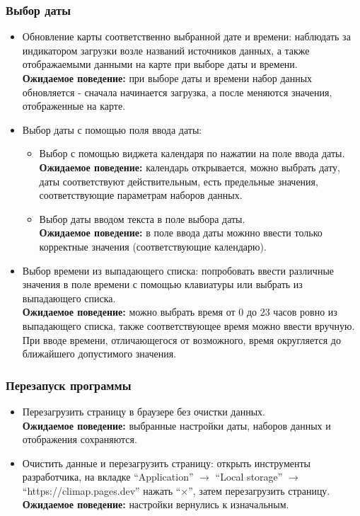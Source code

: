 \documentclass[a4paper, 12pt]{article}
\begin{document}
	\subsubsection{Выбор даты}
	\begin{itemize}
		\item Обновление карты соответственно выбранной дате и времени: наблюдать за индикатором загрузки возле названий
			источников данных, а также отображаемыми данными на карте при выборе даты и времени. \\ \textbf{Ожидаемое
			поведение:} при выборе даты и времени набор данных обновляется - сначала начинается загрузка, а после меняются
			значения, отображенные на карте.

		\item Выбор даты с помощью поля ввода даты:
			\begin{itemize}
				\item Выбор с помощью виджета календаря по нажатии на поле ввода даты. \\ \textbf{Ожидаемое поведение:} календарь
					открывается, можно выбрать дату, даты соответствуют действительным, есть предельные значения, соответствующие параметрам
					наборов данных.

				\item Выбор даты вводом текста в поле выбора даты. \\ \textbf{Ожидаемое поведение:} в поле ввода даты можнно ввести
					только корректные значения (соответствующие календарю).
			\end{itemize}

		\item Выбор времени из выпадающего списка: попробовать ввести различные значения в поле времени с помощью клавиатуры
			или выбрать из выпадающего списка. \\ \textbf{Ожидаемое поведение:} можно выбрать время от 0 до 23 часов ровно из
			выпадающего списка, также соответствующее время можно ввести вручную. При вводе времени, отличающегося от возможного,
			время округляется до ближайшего допустимого значения.
	\end{itemize}

	\subsubsection{Перезапуск программы}\label{subsubsection:6:1:4}
	\begin{itemize}
		\item Перезагрузить страницу в браузере без очистки данных. \\ \textbf{Ожидаемое поведение:} выбранные настройки даты,
			наборов данных и отображения сохраняются.

		\item Очистить данные и перезагрузить страницу: открыть инструменты разработчика, на вкладке \enquote{Application}
			$\rightarrow$ \enquote{Local storage} $\rightarrow$ \enquote{https://climap.pages.dev} нажать \enquote{$\times$},
			затем перезагрузить страницу. \\
			\textbf{Ожидаемое поведение:} настройки вернулись к изначальным.
	\end{itemize}
\end{document}
